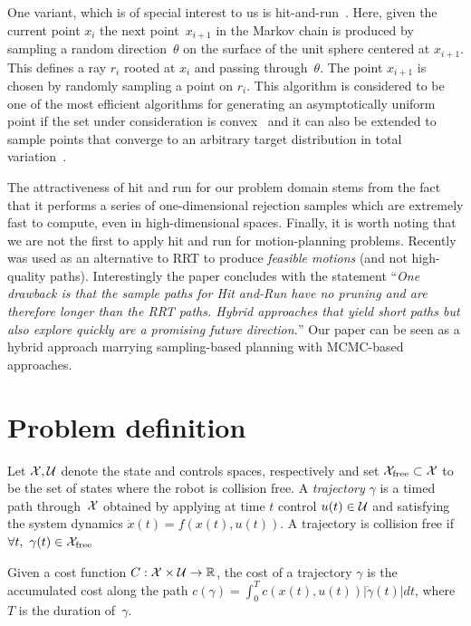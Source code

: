 \documentclass[letterpaper, 10 pt, conference]{ieeeconf}  %
\begin{document}
One variant, which is of special interest to us is 
hit-and-run~\cite{S84,KSZ11}.
Here, given the current point $x_i$ the next point~$x_{i+1}$ in the Markov chain is produced by sampling a random direction~$\theta$ on the surface of the unit sphere centered at $x_{i+1}$. This defines a ray $r_i$ rooted at $x_i$ and passing through~$\theta$. The point $x_{i+1}$ is chosen by randomly sampling a point on $r_i$.
This algorithm is considered to be one of the most efficient algorithms for generating an asymptotically uniform point if the set under consideration is convex~\cite{L99, LV06}
and it can also be extended to sample points that converge to an arbitrary target distribution in total variation~\cite{BRS93, RS94}.

The attractiveness of hit and run for our problem domain stems from the fact that it performs a series of one-dimensional rejection samples which are extremely fast to compute, even in high-dimensional spaces. 
Finally, it is worth noting that we are not the first to apply hit and run for motion-planning problems.
Recently~\cite{YPVA17} was used as an alternative to RRT to produce \emph{feasible motions} (and not high-quality paths). 
Interestingly the paper concludes with the statement ``\emph{One drawback is that the sample paths for Hit and-Run have no pruning and are therefore longer than the RRT paths. Hybrid approaches that yield short paths but also explore quickly are a promising future direction.}''
Our paper can be seen as a hybrid approach marrying sampling-based planning with MCMC-based approaches.

\section{Problem definition}
\label{sec:pdef}



Let $\mathcal{X}, \mathcal{U}$ denote the state and controls spaces, respectively and set $\mathcal{X}_{\rm free} \subset \mathcal{X}$ to be the set of states where the robot is collision free.
A \emph{trajectory} $\gamma$ is a timed path through~$\mathcal{X}$ obtained by applying at time $t$ control $u(t) \in \mathcal{U}$ and satisfying the system dynamics 
$\dot{x}(t) = f( x(t) , u(t) )$.
A trajectory is collision free if $\forall t,~\gamma(t) \in \mathcal{X}_{\rm free}$

Given a cost function $C : \mathcal{X} \times \mathcal{U} \rightarrow \mathbb{R}$, the cost of a trajectory $ \gamma $ is the accumulated cost along the path
$c(\gamma) = \int_0^{T} c( x(t), u(t) ) |\dot{\gamma}(t)|dt$, 
where $T$ is the duration of~$\gamma$.
\end{document}
